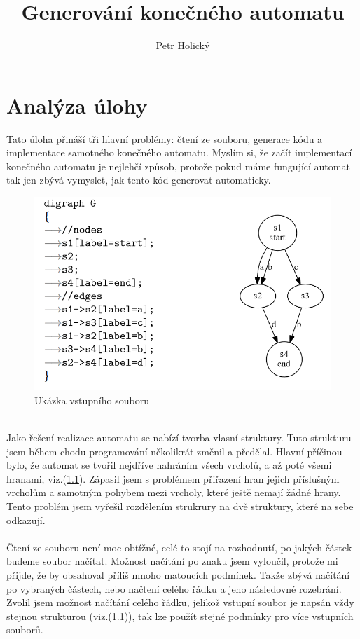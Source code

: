 \documentclass[czech,SP]{thesiskiv}
\author{Petr Holický}
\title{Generování konečného automatu}
\begin{document}
%
\maketitle
\tableofcontents

\chapter{Analýza úlohy }
{Tato úloha přináší tři hlavní problémy: čtení ze souboru, generace kódu a implementace samotného konečného automatu. Myslím si, že začít implementací konečného automatu je nejlehčí způsob, protože pokud máme fungující automat tak jen zbývá vymyslet, jak tento kód generovat automaticky.} 
\\
\begin{figure}[!ht]
\centering
\includegraphics[width=\textwidth]{img1} 
\caption{Ukázka vstupního souboru}
\label{fig:Ukazka}
\end{figure}
\\
{Jako řešení realizace automatu se nabízí tvorba vlasní struktury. Tuto strukturu jsem během chodu programování několikrát změnil a předělal. Hlavní příčinou bylo, že automat se tvořil nejdříve nahráním všech vrcholů, a až poté všemi hranami, viz.(\ref{fig:Ukazka}). Zápasil jsem s problémem přiřazení hran jejich příslušným vrcholům a samotným pohybem mezi vrcholy, které ještě nemají žádné hrany. Tento problém jsem vyřešil rozdělením strukrury na dvě struktury, které na sebe odkazují.  }
\\ \\
{Čtení ze souboru není moc obtížné, celé to stojí na rozhodnutí, po jakých částek budeme soubor načítat. Možnost načítání po znaku jsem vyloučil, protože mi přijde, že by obsahoval příliš mnoho matoucích podmínek. Takže zbývá načítání po vybraných částech, nebo načtení celého řádku a jeho následovné rozebrání. Zvolil jsem možnost načítání celého řádku, jelikož vstupní soubor je napsán vždy stejnou strukturou (viz.(\ref{fig:Ukazka})), tak lze použít stejné podmínky pro více vstupních souborů.}
\end{document}
